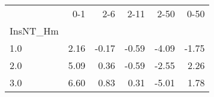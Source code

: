 \begin{tabular}{lrrrrr}
\toprule
{} &   0-1 &   2-6 &  2-11 &  2-50 &  0-50 \\
InsNT\_Hm &       &       &       &       &       \\
\midrule
1.0      &  2.16 & -0.17 & -0.59 & -4.09 & -1.75 \\
2.0      &  5.09 &  0.36 & -0.59 & -2.55 &  2.26 \\
3.0      &  6.60 &  0.83 &  0.31 & -5.01 &  1.78 \\
\bottomrule
\end{tabular}
